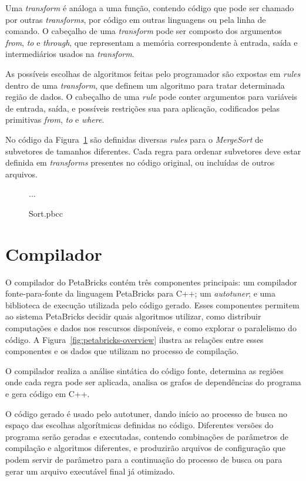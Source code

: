 \documentclass[a4paper, 11pt, twoside]{article}
\begin{document}
Uma \emph{transform} é análoga a uma função, contendo código que pode
ser chamado por outras \emph{transforms}, por código em outras linguagens
ou pela linha de comando. O cabeçalho de uma \emph{transform} pode ser composto
dos argumentos \emph{from}, \emph{to} e \emph{through}, que representam a
memória correspondente à entrada, saída e intermediários usados na 
\emph{transform}.

As possíveis escolhas de algoritmos feitas pelo programador são expostas 
em \emph{rules} dentro de uma \emph{transform}, que definem um algoritmo
para tratar determinada região de dados. O cabeçalho de uma \emph{rule} pode
conter argumentos para variáveis de entrada, saída, e possíveis restrições sua 
para aplicação, codificados pelas primitivas \emph{from}, \emph{to} e 
\emph{where}.

No código da Figura~\ref{fig:sortpbcc} são definidas diversas \emph{rules}
para o \emph{MergeSort} de subvetores de tamanhos diferentes. Cada regra
para ordenar subvetores deve estar definida em \emph{transforms} presentes
no código original, ou incluídas de outros arquivos.

\begin{figure}[H]
    
    ...
    
    \centering
    \caption{Sort.pbcc}
    \label{fig:sortpbcc}
\end{figure}

\section{Compilador}

O compilador do PetaBricks contém três componentes principais: um 
compilador fonte-para-fonte da linguagem PetaBricks para C++; um 
\emph{autotuner}; e uma biblioteca de execução utilizada pelo código gerado.
Esses componentes permitem ao sistema PetaBricks decidir quais algoritmos 
utilizar, como distribuir computações e dados nos rescursos disponíveis, e como
explorar o paralelismo do código. A Figura~\ref{fig:petabricks-overview} 
ilustra as relações entre esses componentes e os dados que utilizam no processo
de compilação.

O compilador realiza a análise sintática do código
fonte, determina as regiões onde cada regra pode ser aplicada, analisa
os grafos de dependências do programa e gera código em C++.

O código gerado é usado pelo autotuner, dando início ao processo de busca no 
espaço das escolhas algorítmicas definidas no código. Diferentes versões
do programa serão geradas e executadas, contendo combinações de parâmetros de
compilação e algoritmos diferentes, e produzirão arquivos de configuração que
podem servir de parâmetro para a continuação do processo de busca ou para gerar
um arquivo executável final já otimizado.
\end{document}
